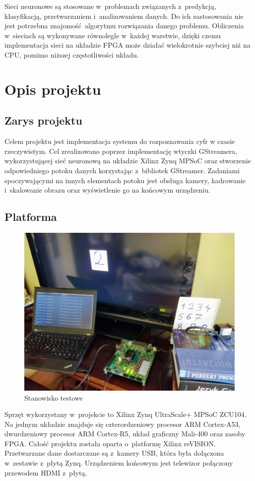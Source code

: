 \documentclass[12pt, oneside, a4paper]{article}
\begin{document}
Sieci neuronowe są stosowane w~problemach
związanych z~predykcją, klasyfikacją, przetwarzaniem i~analizowaniem
danych. Do ich zastosowania nie jest potrzebna znajomość algorytmu rozwiązania
danego problemu. Obliczenia w~sieciach są wykonywane równolegle w~każdej
warstwie, dzięki czemu implementacja sieci na układzie FPGA może działać
wielokrotnie szybciej niż na CPU, pomimo niższej częstotliwości układu.

\newpage
\section{Opis projektu}\label{sec:Opis projektu}

\subsection{Zarys projektu}\label{sec:Zarys projektu}
Celem projektu jest implementacja systemu do rozpoznawania cyfr
w czasie rzeczywistym. Cel zrealizowano poprzez implementację
wtyczki GStreamera, wykorzystującej sieć neuronową na układzie
Xilinx Zynq MPSoC oraz stworzenie odpowiedniego potoku danych
korzystając z~bibliotek GStreamer. Zadaniami spoczywającymi na innych
elementach potoku jest obsługa kamery,
kadrowanie i~skalowanie obrazu oraz wyświetlenie go na końcowym urządzeniu.

\subsection{Platforma}\label{sec:Platforma}
\begin{figure}[h]
  \centering
  \includegraphics[width=0.9\linewidth]{figures/place_of_work_small.jpg}
  \caption{Stanowisko testowe}\label{fig:stanowisko}
\end{figure}
Sprzęt wykorzystany w~projekcie to Xilinx Zynq UltraScale+ MPSoC ZCU104.
\linebreak
Na jednym układzie znajduje się czterordzeniowy procesor
ARM \mbox{Cortex-A53},
dwurdzeniowy procesor ARM \mbox{Cortex-R5},
układ graficzny \mbox{Mali-400} oraz zasoby FPGA.
Całość projektu została oparta o~platformę Xilinx reVISION\cite{revision}.
Przetwarzane
dane dostarczane są z~kamery USB, która była dołączona w~zestawie z~płytą Zynq.
Urządzeniem końcowym jest telewizor połączony przewodem HDMI z~płytą.
\end{document}
